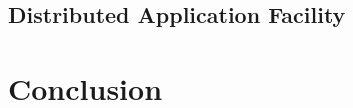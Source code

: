 \documentclass[aspectratio=169]{beamer}
\begin{document}
\subsection{Distributed Application Facility}


\section{Conclusion}
\end{document}
